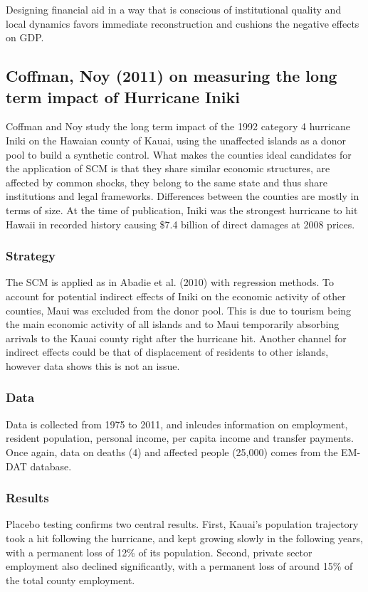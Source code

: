 \documentclass[12pt,a4paper,draft]{article}
\begin{document}
Designing financial aid in a way that is conscious of institutional quality and local 
dynamics favors immediate reconstruction and cushions the negative effects on GDP.



\subsection{Coffman, Noy (2011) on measuring the long term impact of Hurricane Iniki}
Coffman and Noy study the long term impact of the 1992 category 4 hurricane Iniki on 
the Hawaian county of Kauai, using the unaffected islands as a donor pool to build 
a synthetic control. 
What makes the counties ideal candidates for the application of SCM is that they share 
similar economic structures, are affected by common shocks, they belong to the same 
state and thus share institutions and legal frameworks. 
Differences between the counties are mostly in terms of size.
At the time of publication, Iniki was the strongest hurricane to hit Hawaii in recorded 
history causing \$7.4 billion of direct damages at 2008 prices.

\subsubsection*{Strategy}
The SCM is applied as in Abadie et al. (2010) with regression methods. %
To account for potential indirect effects of Iniki on the economic activity of other 
counties, Maui was excluded from the donor pool. This is due to tourism being the 
main economic activity of all islands and to Maui temporarily absorbing arrivals to 
the Kauai county right after the hurricane hit. 
Another channel for indirect effects could be that of displacement of residents to 
other islands, however data shows this is not an issue. 

\subsubsection*{Data}
Data is collected from 1975 to 2011, and inlcudes information on employment, resident 
population, personal income, per capita income and transfer payments.  
Once again, data on deaths (4) and affected people (25,000) comes from the EM-DAT 
database.

\subsubsection*{Results}
Placebo testing confirms two central results. 
First, Kauai's population trajectory took a hit following the hurricane, and kept 
growing slowly in the following years, with a permanent loss of 12\% of its population.
Second, private sector employment also declined significantly, with a permanent loss 
of around 15\% of the total county employment. 
\end{document}
